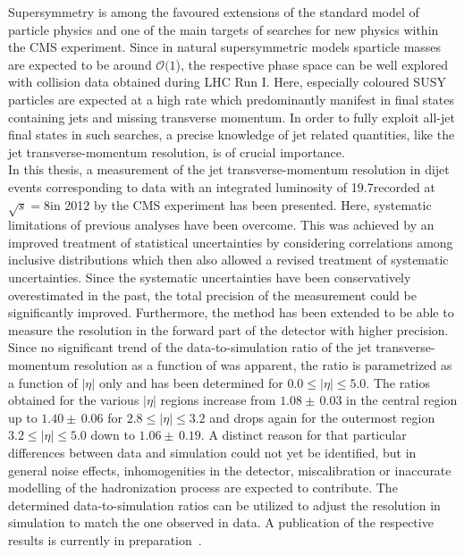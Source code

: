 Supersymmetry is among the favoured extensions of the standard model of particle physics and one of the main targets of searches for new physics within the CMS experiment. Since in natural supersymmetric models sparticle masses are expected to be around $\mathcal{O}(1$\tev), the respective phase space can be well explored with \pp collision data obtained during LHC Run I. Here, especially coloured SUSY particles are expected at a high rate which predominantly manifest in final states containing jets and missing transverse momentum. In order to fully exploit all-jet final states in such searches, a precise knowledge of jet related quantities, like the jet transverse-momentum resolution, is of crucial importance. \\
In this thesis, a measurement of the jet transverse-momentum resolution in dijet events corresponding to data with an integrated luminosity of 19.7\fbinv recorded at $\sqrt{s}=8$\tev in 2012 by the CMS experiment has been presented. Here, systematic limitations of previous analyses have been overcome. This was achieved by an improved treatment of statistical uncertainties by considering correlations among inclusive distributions which then also allowed a revised treatment of systematic uncertainties. Since the systematic uncertainties have been conservatively overestimated in the past, the total precision of the measurement could be significantly improved. Furthermore, the method has been extended to be able to measure the resolution in the forward part of the detector with higher precision. Since no significant trend of the data-to-simulation ratio of the jet transverse-momentum resolution as a function of \ptave was apparent, the ratio is parametrized as a function of $|\eta|$ only and has been determined for $0.0 \leq |\eta| \leq 5.0$. The ratios obtained for the various $|\eta|$ regions increase from $1.08\pm \, 0.03$ in the central region up to $1.40\pm \, 0.06$ for $2.8 \leq |\eta| \leq 3.2$ and drops again for the outermost region $3.2 \leq |\eta| \leq 5.0$ down to $1.06\pm \, 0.19$. A distinct reason for that particular differences between data and simulation could not yet be identified, but in general noise effects, inhomogenities in the detector, miscalibration or inaccurate modelling of the hadronization process are expected to contribute. The determined data-to-simulation ratios can be utilized to adjust the resolution in simulation to match the one observed in data. A publication of the respective results is currently in preparation~\cite{CMS-JME-13-004}. \\

